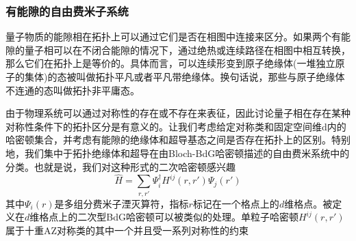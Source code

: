 \documentclass[a4paper]{article}
\numberwithin{equation}{subsection}
\begin{document}
\subsubsection{有能隙的自由费米子系统}
量子物质的能隙相在拓扑上可以通过它们是否在相图中连接来区分。如果两个有能隙的量子相可以在不闭合能隙的情况下，通过绝热或连续路径在相图中相互转换，那么它们在拓扑上是等价的。具体而言，可以连续形变到原子绝缘体(一堆独立原子的集体)的态被叫做拓扑平凡或者平凡带绝缘体。换句话说，那些与原子绝缘体不连通的态叫做拓扑非平庸态。

由于物理系统可以通过对称性的存在或不存在来表征，因此讨论量子相在存在某种对称性条件下的拓扑区分是有意义的。让我们考虑给定对称类和固定空间维d内的哈密顿集合，并考虑有能隙的绝缘体和超导基态之间是否存在拓扑上的区别。特别地，我们集中于拓扑绝缘体和超导在由Bloch-BdG哈密顿描述的自由费米系统中的分类。也就是说，我们对这种形式的二次哈密顿感兴趣
\begin{equation}
    \hat{H}=\sum_{r,r'}\Psi_i^\dagger H^{ij}(r,r')\Psi_j(r')
\end{equation}
其中$\Psi_i(r)$是多组分费米子湮灭算符，指标$r$标记在一个格点上的$d$维格点。被定义在$d$维格点上的二次型BdG哈密顿可以被类似的处理。单粒子哈密顿$H^{ij}(r,r')$属于十重AZ对称类的其中一个并且受一系列对称性的约束
\end{document}
